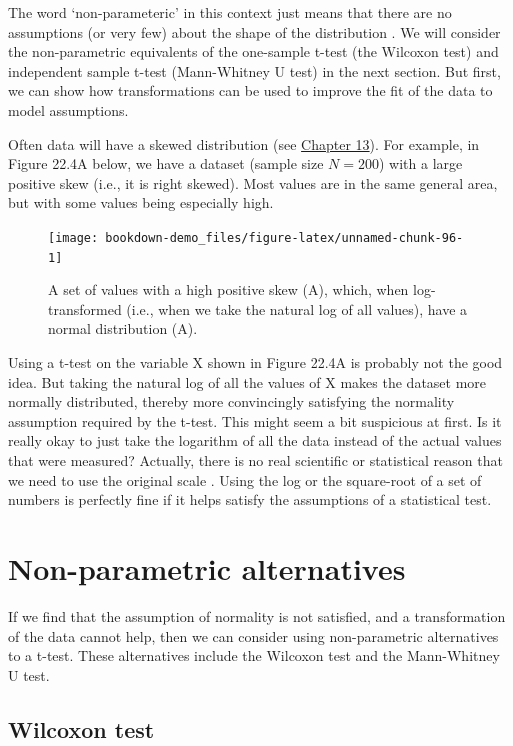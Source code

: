 \documentclass[
]{scrbook}
\begin{document}
The word `non-parameteric' in this context just means that there are no assumptions (or very few) about the shape of the distribution \citep{Dytham2011}.
We will consider the non-parametric equivalents of the one-sample t-test (the Wilcoxon test) and independent sample t-test (Mann-Whitney U test) in the next section.
But first, we can show how transformations can be used to improve the fit of the data to model assumptions.

Often data will have a skewed distribution (see \protect\hyperlink{Chapter_13}{Chapter 13}).
For example, in Figure 22.4A below, we have a dataset (sample size \(N = 200\)) with a large positive skew (i.e., it is right skewed).
Most values are in the same general area, but with some values being especially high.

\begin{figure}
\texttt{[image: bookdown-demo\_files/figure-latex/unnamed-chunk-96-1]} \caption{A set of values with a high positive skew (A), which, when log-transformed (i.e., when we take the natural log of all values), have a normal distribution (A).}\label{fig:unnamed-chunk-96}
\end{figure}

Using a t-test on the variable X shown in Figure 22.4A is probably not the good idea.
But taking the natural log of all the values of X makes the dataset more normally distributed, thereby more convincingly satisfying the normality assumption required by the t-test.
This might seem a bit suspicious at first.
Is it really okay to just take the logarithm of all the data instead of the actual values that were measured?
Actually, there is no real scientific or statistical reason that we need to use the original scale \citep{Sokal1995}.
Using the log or the square-root of a set of numbers is perfectly fine if it helps satisfy the assumptions of a statistical test.

\hypertarget{non-parametric-alternatives}{%
\section{Non-parametric alternatives}\label{non-parametric-alternatives}}

If we find that the assumption of normality is not satisfied, and a transformation of the data cannot help, then we can consider using non-parametric alternatives to a t-test.
These alternatives include the Wilcoxon test and the Mann-Whitney U test.

\hypertarget{wilcoxon-test}{%
\subsection{Wilcoxon test}\label{wilcoxon-test}}
\end{document}
